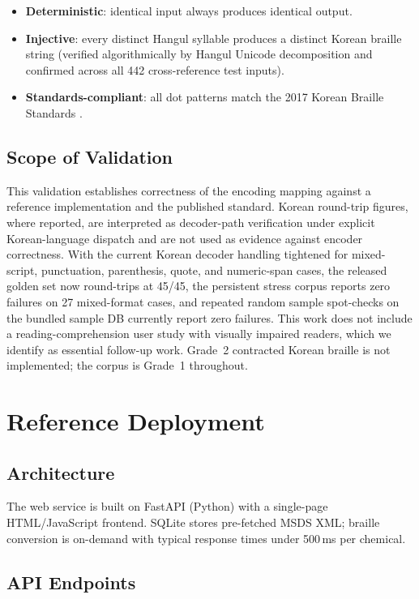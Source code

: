 \documentclass[smallextended]{svjour3}
\begin{document}
\begin{itemize}
\item \textbf{Deterministic}: identical input always produces identical output.
\item \textbf{Injective}: every distinct Hangul syllable produces a distinct Korean braille string (verified algorithmically by Hangul Unicode decomposition and confirmed across all 442 cross-reference test inputs).
\item \textbf{Standards-compliant}: all dot patterns match the 2017 Korean Braille Standards \cite{ko_braille_2017}.
\end{itemize}

\subsection{Scope of Validation}

This validation establishes correctness of the encoding mapping against a reference implementation and the published standard. Korean round-trip figures, where reported, are interpreted as decoder-path verification under explicit Korean-language dispatch and are not used as evidence against encoder correctness. With the current Korean decoder handling tightened for mixed-script, punctuation, parenthesis, quote, and numeric-span cases, the released golden set now round-trips at 45/45, the persistent stress corpus reports zero failures on 27 mixed-format cases, and repeated random sample spot-checks on the bundled sample DB currently report zero failures. This work does not include a reading-comprehension user study with visually impaired readers, which we identify as essential follow-up work. Grade~2 contracted Korean braille is not implemented; the corpus is Grade~1 throughout.

\section{Reference Deployment}
\label{sec:webservice}

\subsection{Architecture}

The web service is built on FastAPI (Python) with a single-page HTML/JavaScript frontend. SQLite stores pre-fetched MSDS XML; braille conversion is on-demand with typical response times under 500\,ms per chemical.

\subsection{API Endpoints}
\end{document}
